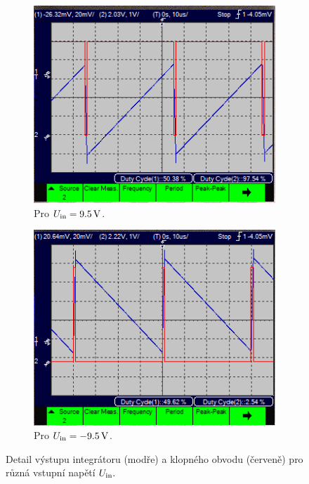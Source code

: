 \documentclass[twoside]{article}
\begin{document}
\begin{figure}
    \begin{subfigure}{0.45\textwidth}
        \includegraphics[width=\textwidth]{9,5V.png}
        \caption{Pro $U_{\rm in} = \SI{9.5}{\volt}$.}
        \label{95V}
    \end{subfigure}    
    \begin{subfigure}{0.45\textwidth}
        \includegraphics[width=\textwidth]{minus9,5.png}
        \caption{Pro $U_{\rm in} = \SI{-9.5}{\volt}$.}
        \label{-95V}
    \end{subfigure}
    \caption{Detail výstupu integrátoru (modře) a
    klopného obvodu (červeně) pro různá vstupní napětí $U_{\rm in}.$}
\end{figure}
\clearpage
\end{document}
